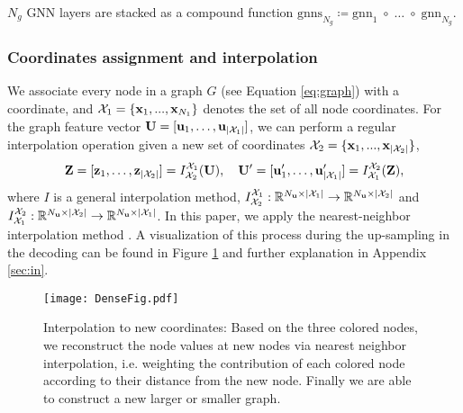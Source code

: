\documentclass{article}
\begin{document}
$N_g$ GNN layers are stacked as a compound function $\mathrm{gnns}_{N_g} \coloneqq \mathrm{gnn}_1\;\circ\;\dots\;\circ\;\mathrm{gnn}_{N_g}$.


\subsubsection{Coordinates assignment and interpolation}
\label{sec:interpolation}
We associate every node in a graph $G$ (see Equation \ref{eq:graph}) with a coordinate, and $\mathcal{X}_1=\{\mathbf{x}_1,...,\mathbf{x}_{N_1}\}$ denotes the set of all node coordinates. For the graph feature vector $\mathbf{U}=[\mathbf{u}_1,\dots,\mathbf{u}_{|\mathcal{X}_1|}]$, we can perform a regular interpolation operation given a new set of coordinates $\mathcal{X}_2 = \{\mathbf{x}_{1},...,\mathbf{x}_{|\mathcal{X}_2|}       \}$,
    \begin{equation}
        \mathbf{Z} =[\mathbf{z}_1,\dots,\mathbf{z}_{|\mathcal{X}_2|}] = I^{\mathcal{X}_1}_{\mathcal{X}_2}(\mathbf{U}),\quad \mathbf{U}'=[\mathbf{u}'_1,\dots,\mathbf{u}'_{|\mathcal{X}_1|}] = I^{\mathcal{X}_2}_{\mathcal{X}_1}(\mathbf{Z}),
    \end{equation}
    where $I$ is a general interpolation method, $I^{\mathcal{X}_1}_{\mathcal{X}_2}:\mathbb{R}^{N_\mathbf{u}\times |\mathcal{X}_1|}\rightarrow \mathbb{R}^{N_\mathbf{u}\times |\mathcal{X}_2|}$ and $I^{\mathcal{X}_2}_{\mathcal{X}_1}:\mathbb{R}^{N_\mathbf{u}\times |\mathcal{X}_2|}\rightarrow \mathbb{R}^{N_\mathbf{u}\times |\mathcal{X}_1|}$. In this paper, we apply the nearest-neighbor interpolation method \cite{qi2017pointnet++}. {A visualization of this process during the up-sampling in the decoding can be found in Figure \ref{fig:grapha} and further explanation in Appendix \ref{sec:in}.}

\begin{figure}[t]
    \centering
    \texttt{[image: DenseFig.pdf]}
    \caption{{Interpolation to new coordinates: Based on the three colored nodes, we reconstruct the node values at new nodes via nearest neighbor interpolation, i.e. weighting the contribution of each colored node according to their distance from the new node. Finally we are able to construct a new larger or smaller graph. }}
    \label{fig:grapha}
\end{figure}
\end{document}
